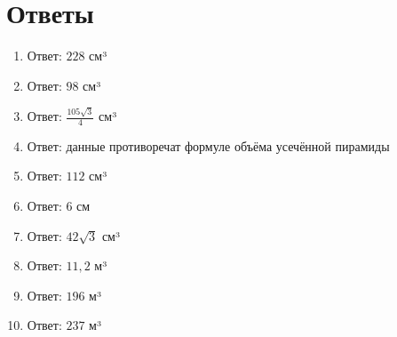 \documentclass{umk-matematika}
\begin{document}
\section*{Ответы}

\begin{enumerate}
  \item Ответ: $228$ см³
  \item Ответ: $98$ см³
  \item Ответ: $\frac{105\sqrt{3}}{4}$ см³
  \item Ответ: данные противоречат формуле объёма усечённой пирамиды
  \item Ответ: $112$ см³
  \item Ответ: $6$ см
  \item Ответ: $42\sqrt{3}$ см³
  \item Ответ: $11{,}2$ м³
  \item Ответ: $196$ м³
  \item Ответ: $237$ м³
\end{enumerate}
\end{document}
